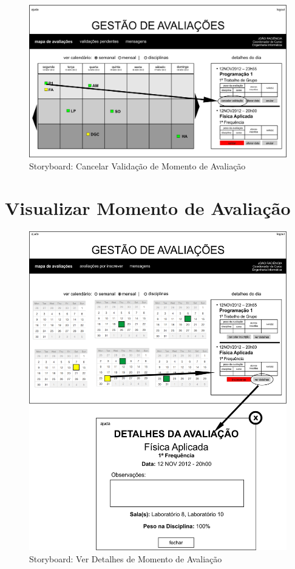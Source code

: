 \begin{figure}[!htbp]
\centering
\includegraphics{imagens/cancelar_validacao_de_momento_de_avaliacao_i.jpg}
\caption{Storyboard: Cancelar Validação de Momento de Avaliação}
\label{fig:cancelar_validacao_de_momento_de_avaliacao_i}
\end{figure}

\clearpage
\section{Visualizar Momento de Avaliação}

\begin{figure}[!htbp]
\centering
\includegraphics{imagens/ver_detalhes_de_momento_de_avaliacao_i.jpg}
\caption{Storyboard: Ver Detalhes de Momento de Avaliação}
\label{fig:ver_detalhes_de_momento_de_avaliacao_i}
\end{figure}

